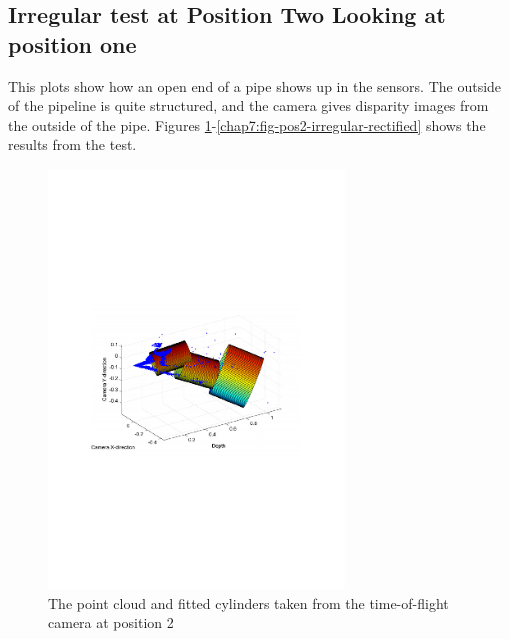 \subsection{Irregular test at Position Two Looking at position one}
This plots show how an open end of a pipe shows up in the sensors. The outside of the
pipeline is quite structured, and the camera gives disparity images from the outside of
the pipe. Figures
\ref{chap7:fig-pos2-irregular-tof-3d}-\ref{chap7:fig-pos2-irregular-rectified} shows the
results from the test. 
\begin{figure}[htbp]
    \centering
    \includegraphics[width=0.7\textwidth]{pics/pos2-irregular-tof-3d}
    \caption{The point cloud and fitted cylinders taken from the time-of-flight camera at
    position 2}
    \label{chap7:fig-pos2-irregular-tof-3d}
\end{figure}
